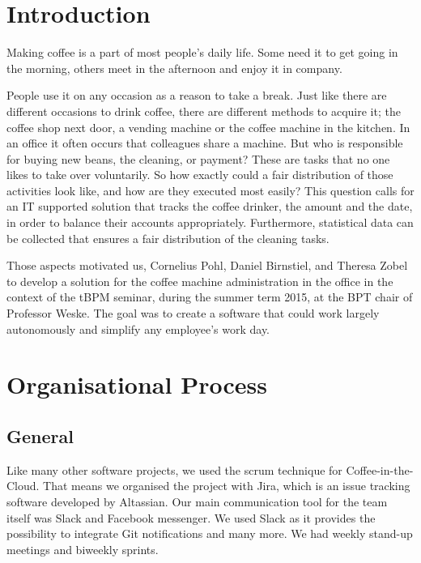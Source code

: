 \newpage
\newpage
\section{Introduction}\label{introduction}

Making coffee is a part of most people's daily life. Some need it to get
going in the morning, others meet in the afternoon and enjoy it in
company.

People use it on any occasion as a reason to take a break. Just like
there are different occasions to drink coffee, there are different
methods to acquire it; the coffee shop next door, a vending machine or
the coffee machine in the kitchen. In an office it often occurs that
colleagues share a machine. But who is responsible for buying new beans,
the cleaning, or payment? These are tasks that no one likes to take over
voluntarily. So how exactly could a fair distribution of those
activities look like, and how are they executed most easily? This
question calls for an IT supported solution that tracks the coffee
drinker, the amount and the date, in order to balance their accounts
appropriately. Furthermore, statistical data can be collected that
ensures a fair distribution of the cleaning tasks.

Those aspects motivated us, Cornelius Pohl, Daniel Birnstiel, and
Theresa Zobel to develop a solution for the coffee machine
administration in the office in the context of the tBPM seminar, during
the summer term 2015, at the BPT chair of Professor Weske. The goal was
to create a software that could work largely autonomously and simplify
any employee's work day.

\newpage
\newpage
\section{Organisational Process}\label{organisational-process}

\subsection{General}\label{general}

Like many other software projects, we used the scrum technique for
Coffee-in-the-Cloud. That means we organised the project with Jira,
which is an issue tracking software developed by Altassian. Our main
communication tool for the team itself was Slack and Facebook messenger.
We used Slack as it provides the possibility to integrate Git
notifications and many more. We had weekly stand-up meetings and
biweekly sprints.

